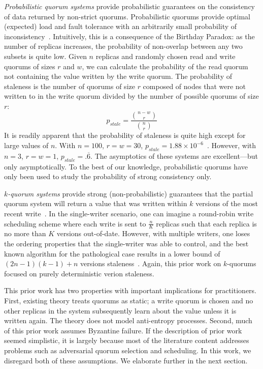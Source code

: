 \documentclass{vldb}
\begin{document}
\textit{Probabilistic quorum systems} provide probabilistic guarantees
on the consistency of data returned by non-strict quorums.
Probabilistic quorums provide optimal (expected) load and fault
tolerance with an arbitrarily small probability of
inconsistency~\cite{prob-quorum}.  Intuitively, this is a consequence
of the Birthday Paradox: as the number of replicas increases, the
probability of non-overlap between any two subsets is quite low.
Given $n$ replicas and randomly chosen read and write quorums of sizes
$r$ and $w$, we can calculate the probability of the read quorum not
containing the value written by the write quorum.  The probability of
staleness is the number of quorums of size $r$ composed of nodes that
were not written to in the write quorum divided by the number of
possible quorums of size $r$:
\begin{equation}
\label{eq:prob-strict}
p_{stale}=\frac{{n-w \choose r}}{{n \choose r}}
\end{equation}
It is readily apparent that the probability of staleness is quite high
except for large values of $n$.  With $n=100$, $r=w=30$, $p_{stale} =
1.88 \times 10^{-6}$~\cite{nonstrict-availability}.  However, with
$n=3$, $r=w=1$, $p_{stale} = .\overline{6}$.  The asymptotics of these
systems are excellent---but only asymptotically.  To the best of our
knowledge, probabilistic quorums have only been used to study the
probability of strong consistency only.

\textit{$k$-quorum systems} provide strong (non-probabilistic)
guarantees that the partial quorum system will return a value that was
written within $k$ versions of the most recent
write~\cite{nonstrict-availability}.  In the single-writer scenario,
one can imagine a round-robin write scheduling scheme where each write
is sent to $\frac{n}{K}$ replicas such that each replica is no more
than $K$ versions out-of-date.  However, with multiple writers, one
loses the ordering properties that the single-writer was able to
control, and the best known algorithm for the pathological case
results in a lower bound of $(2n-1)(k-1)+n$ versions staleness~\cite{k-quorum-lb}.
Again, this prior work on $k$-quorums focused on purely deterministic
verion staleness.

This prior work has two properties with important implications for
practitioners.  First, existing theory treats quorums as static; a
write quorum is chosen and no other replicas in the system
subsequently learn about the value unless it is written again.  The
theory does not model anti-entropy processes.  Second, much of this
prior work assumes Byzantine failure.  If the description of prior
work seemed simplistic, it is largely because most of the literature
content addresses problems such as adversarial quorum selection and
scheduling.  In this work, we disregard both of these assumptions.  We
elaborate further in the next section.
\end{document}
